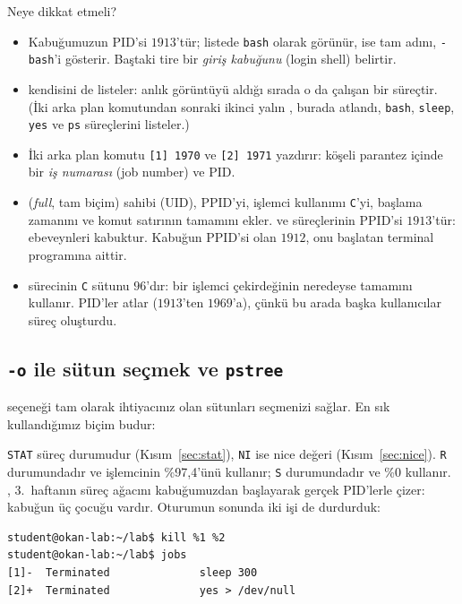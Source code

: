 Neye dikkat etmeli?
\begin{itemize}
  \item Kabuğumuzun PID'si $1913$'tür; listede \texttt{bash} olarak görünür,  ise tam adını, \texttt{-bash}'i gösterir. Baştaki tire bir \emph{giriş kabuğunu} (login shell) belirtir.
  \item {} kendisini de listeler: anlık görüntüyü aldığı sırada o da çalışan bir süreçtir. (İki arka plan komutundan sonraki ikinci yalın , burada atlandı, \texttt{bash}, \texttt{sleep}, \texttt{yes} ve \texttt{ps} süreçlerini listeler.)
  \item İki arka plan komutu \texttt{[1] 1970} ve \texttt{[2] 1971} yazdırır: köşeli parantez içinde bir \emph{iş numarası} (job number) ve PID.
  \item {} (\emph{full}, tam biçim) sahibi (UID), PPID'yi, işlemci kullanımı \texttt{C}'yi, başlama zamanını ve komut satırının tamamını ekler.  ve  süreçlerinin PPID'si $1913$'tür: ebeveynleri kabuktur. Kabuğun PPID'si olan $1912$, onu başlatan terminal programına aittir.
  \item {} sürecinin \texttt{C} sütunu $96$'dır: bir işlemci çekirdeğinin neredeyse tamamını kullanır. PID'ler atlar ($1913$'ten $1969$'a), çünkü bu arada başka kullanıcılar süreç oluşturdu.
\end{itemize}

\subsection{\texttt{-o} ile sütun seçmek ve \texttt{pstree}}

 seçeneği tam olarak ihtiyacınız olan sütunları seçmenizi sağlar. En sık kullandığımız biçim budur:



\texttt{STAT} süreç durumudur (Kısım~\ref{sec:stat}), \texttt{NI} ise nice değeri (Kısım~\ref{sec:nice}).  \texttt{R} durumundadır ve işlemcinin \%97,4'ünü kullanır;  \texttt{S} durumundadır ve \%0 kullanır. , 3.~haftanın süreç ağacını kabuğumuzdan başlayarak gerçek PID'lerle çizer: kabuğun üç çocuğu vardır. Oturumun sonunda iki işi de durdurduk:

\begin{lstlisting}[style=wterm]
student@okan-lab:~/lab$ kill %1 %2
student@okan-lab:~/lab$ jobs
[1]-  Terminated              sleep 300
[2]+  Terminated              yes > /dev/null
\end{lstlisting}

